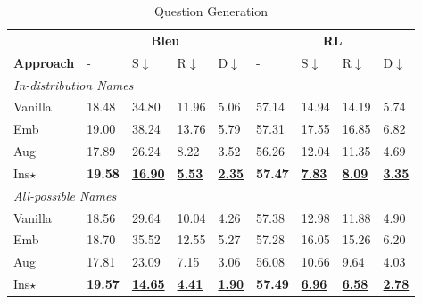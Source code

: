 \begin{table}[t]
	\begin{subtable}{\linewidth}
		\scriptsize
		\centering
		\begin{tabular}{p{0.9cm}|p{0.36cm}p{0.36cm}p{0.36cm}p{0.36cm}|p{0.36cm}p{0.36cm}p{0.36cm}p{0.38cm}}
			\toprule[1pt]
			
			 & \multicolumn{4}{c|}{\textbf{Bleu}} & \multicolumn{4}{c}{\textbf{RL}} \\
			\textbf{Approach}& - & S$\downarrow$ & R$\downarrow$ & D$\downarrow$ & - & S$\downarrow$ & R$\downarrow$ & D$\downarrow$ \\
			
			\hline
			\multicolumn{9}{l}{\textit{In-distribution Names}}\\
			Vanilla & 18.48 &  34.80& 11.96 & 5.06&{57.14}&14.94&14.19 & 5.74\\
			Emb & 19.00 &38.24& 13.76 & 5.79 & 57.31 &17.55& 16.85 & 6.82 \\
			Aug & 17.89 & 26.24  & 8.22& {3.52}&56.26& 12.04& {11.35} & {4.69} \\
			

			Ins$\star$ &  \textbf{19.58 }&\underline{\textbf{16.90}} & \underline{\textbf{5.53}} & \underline{\textbf{2.35}}& \textbf{57.47} &\underline{\textbf{7.83}} & \underline{\textbf{8.09}} &\underline{\textbf{3.35}}\\

			
			\hline
			\multicolumn{9}{l}{\textit{All-possible Names}}\\
			Vanilla & 18.56 & 29.64 & 10.04 & 4.26& {57.38}&12.98& 11.88 & 4.90 \\
			Emb & 18.70 & 35.52& 12.55 & 5.27 &57.28 &16.05 & 15.26 & 6.20 \\
			Aug & 17.81 &  23.09 & {7.15} & {3.06}&56.08&10.66& {9.64} & {4.03} \\
			

			Ins$\star$ &  \textbf{19.57} & \underline{\textbf{14.65}} & \underline{\textbf{4.41}} & \underline{\textbf{1.90}} &\textbf{57.49}&\underline{\textbf{6.96}} & \underline{\textbf{6.58}} & \underline{\textbf{2.78}}\\
			
			\bottomrule[1pt]
		\end{tabular}
		\caption{Question Generation}
		\label{tab:mdresults-qg}
	\end{subtable}
	

\end{table}
